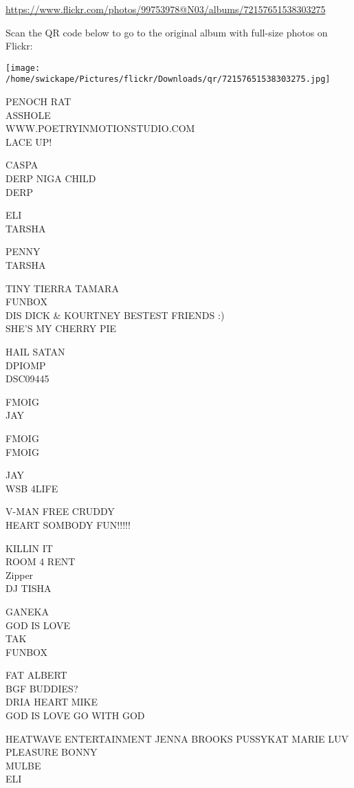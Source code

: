 \documentclass[10pt,letterpaper]{article}
\begin{document}
\url{https://www.flickr.com/photos/99753978@N03/albums/72157651538303275}

Scan the QR code below to go to the original album with full-size photos on Flickr:

\texttt{[image: /home/swickape/Pictures/flickr/Downloads/qr/72157651538303275.jpg]}
\pagebreak

PENOCH RAT\\
ASSHOLE\\
WWW.POETRYINMOTIONSTUDIO.COM\\
LACE UP!

CASPA\\
DERP NIGA CHILD\\
DERP

ELI\\
TARSHA

PENNY\\
TARSHA

TINY TIERRA TAMARA\\
FUNBOX\\
DIS DICK \& KOURTNEY BESTEST FRIENDS :)\\
SHE'S MY CHERRY PIE

HAIL SATAN\\
DPIOMP\\
DSC09445

FMOIG\\
JAY

FMOIG\\
FMOIG

JAY\\
WSB 4LIFE

V{-}MAN FREE CRUDDY\\
HEART SOMBODY FUN!!!!!

KILLIN IT\\
ROOM 4 RENT\\
Zipper\\
DJ TISHA

GANEKA\\
GOD IS LOVE\\
TAK\\
FUNBOX

FAT ALBERT\\
BGF BUDDIES?\\
DRIA HEART MIKE\\
GOD IS LOVE GO WITH GOD

HEATWAVE ENTERTAINMENT JENNA BROOKS PUSSYKAT MARIE LUV PLEASURE BONNY\\
MULBE\\
ELI
\end{document}

